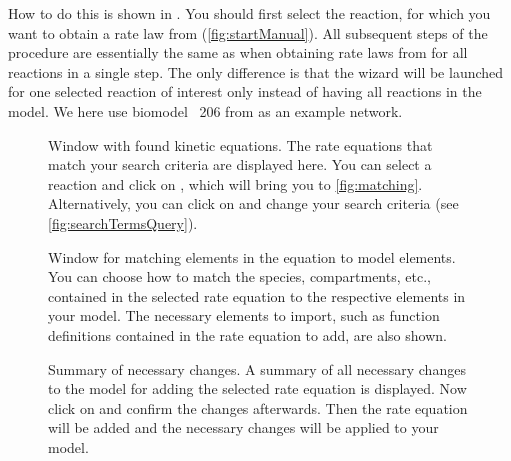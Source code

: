 How to do this is shown in .
You should first select the reaction, for which you want to obtain a rate law from \SABIO (\vref{fig:startManual}).
All subsequent steps of the procedure are essentially the same as when obtaining rate laws from \SABIO for all reactions in a single step.
The only difference is that the \SABIO wizard will be launched for one selected reaction of interest only instead of having all reactions in the model.
We here use biomodel \numero~206 from \BioModels \citep{Li2010a} as an example network.
\begin{figure}[t!]
\caption[Window with found kinetic equations]{Window with found kinetic equations.
The rate equations that match your search criteria are displayed here.
You can select a reaction and click on , which will bring you to \vref{fig:matching}.
Alternatively, you can click on  and change your search criteria (see \vref{fig:searchTermsQuery}).
}
\label{fig:foundEquationsManual}
\end{figure}
\begin{figure}[t!]
\caption[Window for matching elements in the equation to model elements]{Window for matching elements in the equation to model elements.
You can choose how to match the species, compartments, etc., contained in the selected rate 
equation to the respective \SBML elements in your model. The necessary elements to import,
such as function definitions contained in the rate equation to add, are also shown.}
\label{fig:matching}
\end{figure}
\begin{figure}[t!]
\caption[Summary of necessary changes]{Summary of necessary changes.
A summary of all necessary changes to the model for adding the selected rate equation is displayed.
Now click on  and confirm the changes afterwards.  Then the rate equation will be
added and the necessary changes will be applied to your model.}
\label{fig:changesManual}
\end{figure}



